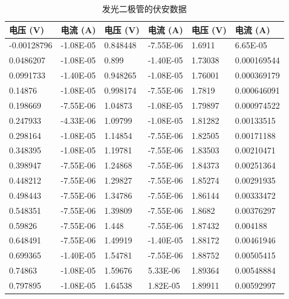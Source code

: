 \documentclass[UTF8]{article}
\theoremstyle{MyLineTheoremStyle} %
\theoremstyle{MyBlockTheoremStyle} %
\theoremstyle{MySubsubsectionStyle} %
\begin{document}
\begin{table}[H]\centering
\caption{发光二极管的伏安数据}
\label{发光二极管伏安数据}
\begin{tabular}{|ll|ll|ll|}
    \hline
    电压 (V)  & 电流 (A)   & 电压 (V)  & 电流 (A)   &电压 (V)  & 电流 (A) \\ \hline
    -0.00128796 & -1.08E-05 & 0.848448 & -7.55E-06 & 1.6911  & 6.65E-05     \\
    0.0486207   & -1.08E-05 & 0.899    & -1.40E-05 & 1.73038 & 0.000169544  \\
    0.0991733   & -1.40E-05 & 0.948265 & -1.08E-05 & 1.76001 & 0.000369179  \\
    0.14876     & -1.08E-05 & 0.998174 & -7.55E-06 & 1.7819  & 0.000646091  \\
    0.198669    & -7.55E-06 & 1.04873  & -1.08E-05 & 1.79897 & 0.000974522  \\
    0.247933    & -4.33E-06 & 1.09799  & -1.08E-05 & 1.81282 & 0.00133515   \\
    0.298164    & -1.08E-05 & 1.14854  & -7.55E-06 & 1.82505 & 0.00171188   \\
    0.348395    & -1.08E-05 & 1.19781  & -7.55E-06 & 1.83503 & 0.00210471   \\
    0.398947    & -7.55E-06 & 1.24868  & -7.55E-06 & 1.84373 & 0.00251364   \\
    0.448212    & -7.55E-06 & 1.29827  & -7.55E-06 & 1.85274 & 0.00291935   \\
    0.498443    & -7.55E-06 & 1.34786  & -7.55E-06 & 1.86144 & 0.00333472   \\
    0.548351    & -7.55E-06 & 1.39809  & -7.55E-06 & 1.8682  & 0.00376297   \\
    0.59826     & -7.55E-06 & 1.448    & -7.55E-06 & 1.87432 & 0.004188     \\
    0.648491    & -7.55E-06 & 1.49919  & -1.40E-05 & 1.88172 & 0.00461946   \\
    0.699365    & -1.40E-05 & 1.54781  & -7.55E-06 & 1.88752 & 0.00505415   \\
    0.74863     & -1.08E-05 & 1.59676  & 5.33E-06  & 1.89364 & 0.00548884   \\
    0.797895    & -1.08E-05 & 1.64538  & 1.82E-05  & 1.89911 & 0.00592997  \\
    \hline
\end{tabular}
\end{table}
\end{document}
